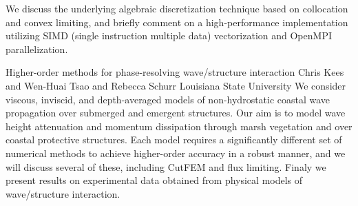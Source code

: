 \begin{addmargin}[2em]{0em}
{	We discuss the underlying algebraic discretization technique based on
	collocation and convex limiting, and briefly comment on a high-performance
	implementation utilizing SIMD (single instruction multiple data)
	vectorization and OpenMPI parallelization.
}


\vspace{1.5ex}
\abs
{Higher-order methods for phase-resolving wave/structure interaction}
{Chris Kees and Wen-Huai Tsao and Rebecca Schurr}
{Louisiana State University}
{We consider viscous, inviscid, and depth-averaged models of
	non-hydrostatic coastal wave propagation over submerged and emergent
	structures. Our aim is to model wave height attenuation and momentum
	dissipation through marsh vegetation and over coastal protective
	structures. Each model requires a significantly different set of
	numerical methods to achieve higher-order accuracy in a robust manner,
	and we will discuss several of these, including CutFEM and flux
	limiting. Finaly we present results on experimental data obtained from
	physical models of wave/structure interaction.}
\end{addmargin}
